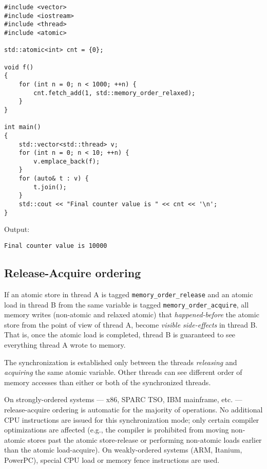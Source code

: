 \documentclass[a4paper,12pt,notitlepage,twoside,openright]{article}
\begin{document}
\begin{verbatim}
#include <vector>
#include <iostream>
#include <thread>
#include <atomic>

std::atomic<int> cnt = {0};

void f()
{
    for (int n = 0; n < 1000; ++n) {
        cnt.fetch_add(1, std::memory_order_relaxed);
    }
}

int main()
{
    std::vector<std::thread> v;
    for (int n = 0; n < 10; ++n) {
        v.emplace_back(f);
    }
    for (auto& t : v) {
        t.join();
    }
    std::cout << "Final counter value is " << cnt << '\n';
}
\end{verbatim}

Output:

\begin{verbatim}
Final counter value is 10000
\end{verbatim}

\hypertarget{release-acquire-ordering}{%
\subsection{Release-Acquire ordering}\label{release-acquire-ordering}}

If an atomic store in thread A is tagged \texttt{memory\_order\_release} and an
atomic load in thread B from the same variable is tagged
\texttt{memory\_order\_acquire}, all memory writes (non-atomic and relaxed
atomic) that \emph{happened-before} the atomic store from the point of
view of thread A, become \emph{visible side-effects} in thread B. That
is, once the atomic load is completed, thread B is guaranteed to see
everything thread A wrote to memory.

The synchronization is established only between the threads
\emph{releasing} and \emph{acquiring} the same atomic variable. Other
threads can see different order of memory accesses than either or both
of the synchronized threads.

On strongly-ordered systems --- x86, SPARC TSO, IBM mainframe, etc. ---
release-acquire ordering is automatic for the majority of operations. No
additional CPU instructions are issued for this synchronization mode;
only certain compiler optimizations are affected (e.g., the compiler is
prohibited from moving non-atomic stores past the atomic store-release
or performing non-atomic loads earlier than the atomic load-acquire). On
weakly-ordered systems (ARM, Itanium, PowerPC), special CPU load or
memory fence instructions are used.
\end{document}
